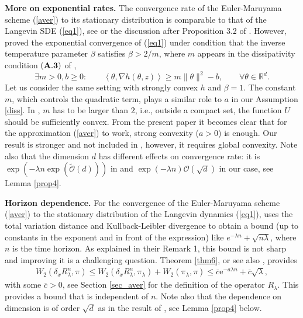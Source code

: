 \documentclass[a4paper]{article}
\def\e{\text{e}}
\def\Rl{R_{\lambda}}
\begin{document}
\textbf{More on exponential rates.} The convergence rate of the Euler-Maruyama scheme (\ref{aver}) to its stationary distribution is comparable to that of the Langevin SDE (\ref{eq1}), see \cite{Rob1996} or the discussion after Proposition 3.2 of \cite{raginsky}. However, \cite{raginsky} proved the exponential convergence of
(\ref{eq1}) under condition that the inverse temperature parameter $\beta$ satisfies $\beta > 2/m$, where $m$ appears in the dissipativity condition $\bf {(A.3)}$ of \cite{raginsky},
$$ \exists m >0, b \ge 0: \qquad \left\langle \theta, \nabla h (\theta,z) \right\rangle \ge m\|\theta\|^2 -b, \qquad \forall \theta \in \mathbb{R}^{d}.$$ 
Let us consider the same setting with strongly convex $h$ and $\beta = 1$. The constant $m$, which controls the quadratic term, plays a similar role to $a$ in our Assumption \ref{diss}. In \cite{raginsky}, $m$ has to be larger than $2$, i.e., outside a compact set, the function $U$ should be sufficiently convex. From the present paper it becomes clear that for the approximation (\ref{aver}) to work, strong convexity ($a>0$) is enough. Our result is stronger and not included in \cite{raginsky}, however, it requires global convexity. Note also that the dimension $d$ has different effects on convergence rate: it is $\exp(- \lambda n \exp(\tilde{\mathcal{O}}(d)))$ in \cite{raginsky} and $\exp(-\lambda n) \mathcal{O}(\sqrt{d})$ in our case, see Lemma \ref{prop4}.

\textbf{Horizon dependence.} For the convergence of the Euler-Maruyama scheme (\ref{aver}) to the stationary distribution of the Langevin dynamics (\ref{eq1}), \cite{dalalyan} uses the total variation distance and Kullback-Leibler divergence to obtain a bound (up to constants in the exponent and
in front of the expression) like $e^{-\lambda n} + \sqrt{n\lambda}$, where $n$ is the time horizon. As explained in their Remark 1, this bound is not sharp and improving it is a challenging question. Theorem \ref{thm6}, or see also \cite{durmus-moulines},  provides 
\begin{align}
W_2(\delta_x \Rl^n,\pi) \leq W_2(\delta_x \Rl^n,\pi_{\lambda})+W_2(\pi_{\lambda},\pi)\leq \overline{c} \e^{-a\lambda n}+\overline{c} \sqrt{\lambda},
\end{align}
with some $\overline{c}>0$, see Section \ref{sec_aver} for the definition of
the operator $R_{\lambda}$. This provides a bound that is independent of $n$. Note also that the dependence on dimension is of order $\sqrt{d}$ as in the result of \cite{dalalyan}, see Lemma \ref{prop4} below.
\end{document}
